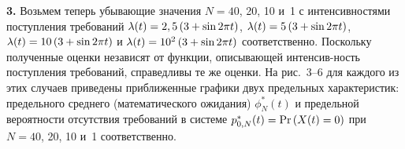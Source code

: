 {\begin{multicols}{2}
\smallskip

{\bf 3.} Возьмем теперь убывающие значения $N=40$, 20, 10 и~1 с
интенсивностями поступления требований
$\lambda(t)\hm=2,5\left(3\hm+\sin{2\pi t}\right)$,
$\lambda(t)\hm=5\left(3\hm+\sin{2\pi t}\right)$,
$\lambda(t)\hm=10\left(3\hm+\sin{2\pi t}\right)$ и
$\lambda(t)\hm=10^2\left(3\hm+\sin{2\pi t}\right)$  соответственно.
Поскольку полученные оценки не\linebreak зависят от функции, описывающей
интенсив-\linebreak ность поступления требований, справедливы те же оценки. На
рис.~3--6 для каждого из этих случаев приведены приближенные
графики двух \mbox{предельных} характеристик: предельного среднего
(математического ожидания) $\phi^*_{N}(t)$ и предельной вероятности
отсутствия требований в системе $p^*_{0,N}(t)\hm=\mathrm{Pr}\left(X(t)=0\right)$ при
$N=40$, 20, 10 и~1 соответственно.



\begin{figure*} %
\vspace*{1pt}
\begin{center}
\mbox{%
\epsfxsize=161.688mm
}
\end{center}
\vspace*{-9pt}
\end{figure*}


\begin{figure*} %
\vspace*{1pt}
\begin{center}
\mbox{%
\epsfxsize=161mm
}
\end{center}
\vspace*{-9pt}
\end{figure*}


\begin{figure*} %
\vspace*{1pt}
\begin{center}
\mbox{%
\epsfxsize=161.688mm
}
\end{center}
\vspace*{-9pt}
\end{figure*}



\end{multicols}}
